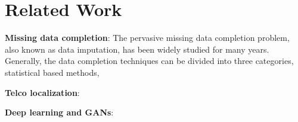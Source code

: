 \section{Related Work}

\textbf{Missing data completion}:
The pervasive missing data completion problem, also known as data imputation, has been widely studied for many years. Generally, the data completion techniques can be divided into three categories, statistical based methods, 

\textbf{Telco localization}:

\textbf{Deep learning and GANs}: 